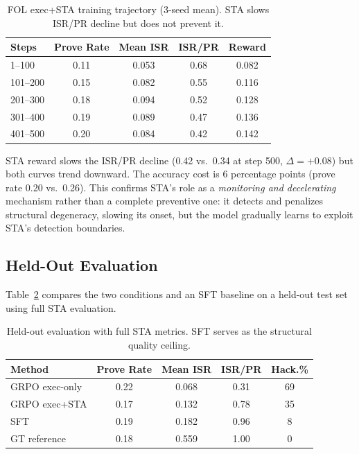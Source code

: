 \documentclass[11pt,a4paper]{article}
\begin{document}
\begin{table}[t]
\centering
\small
\caption{FOL exec+STA training trajectory (3-seed mean). STA slows ISR/PR decline but does not prevent it.}
\label{tab:sta_trajectory}
\begin{tabular}{lcccc}
\toprule
Steps & Prove Rate & Mean ISR & ISR/PR & Reward \\
\midrule
1--100   & 0.11 & 0.053 & 0.68 & 0.082 \\
101--200 & 0.15 & 0.082 & 0.55 & 0.116 \\
201--300 & 0.18 & 0.094 & 0.52 & 0.128 \\
301--400 & 0.19 & 0.089 & 0.47 & 0.136 \\
401--500 & 0.20 & 0.084 & 0.42 & 0.142 \\
\bottomrule
\end{tabular}
\end{table}

STA reward slows the ISR/PR decline (0.42 vs.\ 0.34 at step 500, $\Delta = +0.08$) but both curves trend downward.
The accuracy cost is 6 percentage points (prove rate 0.20 vs.\ 0.26).
This confirms STA's role as a \emph{monitoring and decelerating} mechanism rather than a complete preventive one: it detects and penalizes structural degeneracy, slowing its onset, but the model gradually learns to exploit STA's detection boundaries.

\subsection{Held-Out Evaluation}
\label{sec:heldout}

Table~\ref{tab:heldout} compares the two conditions and an SFT baseline on a held-out test set using full STA evaluation.

\begin{table}[t]
\centering
\small
\caption{Held-out evaluation with full STA metrics. SFT serves as the structural quality ceiling.}
\label{tab:heldout}
\begin{tabular}{lcccc}
\toprule
Method & Prove Rate & Mean ISR & ISR/PR & Hack.\% \\
\midrule
GRPO exec-only   & 0.22 & 0.068 & 0.31 & 69 \\
GRPO exec+STA    & 0.17 & 0.132 & 0.78 & 35 \\
SFT              & 0.19 & 0.182 & 0.96 &  8 \\
GT reference     & 0.18 & 0.559 & 1.00 &  0 \\
\bottomrule
\end{tabular}
\end{table}
\end{document}
